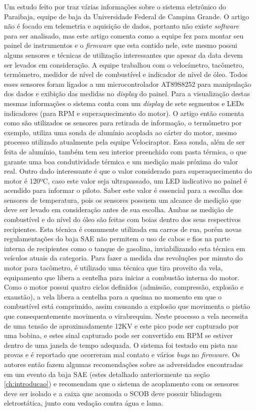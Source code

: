 Um estudo feito por \cite{projetoMiniBaja2006} traz várias informações sobre o sistema eletrônico do Paraibaja, equipe de baja da Universidade Federal de Campina Grande. O artigo não é focado em telemetria e aquisição de dados, portanto não existe \textit{software} para ser analisado, mas este artigo comenta como a equipe fez para montar seu painel de instrumentos e o \textit{firmware} que esta contido nele, este mesmo possui alguns sensores e técnicas de utilização interessantes que apesar da data devem ser levados em consideração. A equipe trabalhou com o velocímetro, tacômetro, termômetro, medidor de nível de combustível e indicador de nível de óleo. Todos esses sensores foram ligados a um microcontrolador AT89S8252 para manipulação dos dados e exibição das medidas no \textit{display} do painel. Para a visualização destas mesmas informações o sistema conta com um \textit{display} de sete segmentos e LEDs indicadores (para RPM e superaquecimento do motor). O artigo então comenta como são utilizados os sensores para retirada de informação, o termômetro por exemplo, utiliza uma sonda de alumínio acoplada ao cárter do motor, mesmo processo utilizado atualmente pela equipe Velociraptor. Essa sonda, além de ser feita de alumínio, também tem seu interior preenchido com pasta térmica, o que garante uma boa condutividade térmica e um medição mais próxima do valor real. Outro dado interessante é que o valor considerado para superaquecimento do motor é 120ºC, caso este valor seja ultrapassado, um LED indicativo no painel é acendido para informar o piloto. Saber este valor é essencial para a escolha dos sensores de temperatura, pois os sensores possuem um alcance de medição que deve ser levado em consideração antes de sua escolha. Ambas as medição de combustível e do nível do óleo são feitas com boias dentro dos seus respectivos recipientes. Esta técnica é comumente utilizada em carros de rua, porém novas regulamentações do baja SAE \cite{regulamentobajasae} não permitem o uso de cabos e fios na parte interna de recipientes como o tanque de gasolina, inviabilizando esta técnica em veículos atuais da categoria. Para fazer a medida das revoluções por minuto do motor para tacômetro, é utilizado uma técnica que tira proveito da vela, equipamento que libera a centelha para iniciar a combustão interna do motor. Como o motor possui quatro ciclos definidos (admissão, compressão, explosão e exaustão), a vela libera a centelha para a queima no momento em que o combustível está comprimido, assim causando a explosão que movimenta o pistão que consequentemente movimenta o virabrequim. Neste processo a vela necessita de uma tensão de aproximadamente 12KV e este pico pode ser capturado por uma bobina, e estes sinal capturado pode ser convertido em RPM se estiver dentro de uma janela de tempo adequada. O sistema foi testado em pista nas provas e é reportado que ocorreram mal contato e vários \textit{bugs} no \textit{firmware}. Os autores então fazem algumas recomendações sobre as adversidades encontradas em um evento da baja SAE (estes detalhado anteriormente na seção \ref{ch:introducao}) e recomendam que o sistema de acoplamento com os sensores deve ser isolado e a caixa que acomoda o SCOB deve possuir blindagem eletrostática, junto com vedação contra água e lama.

